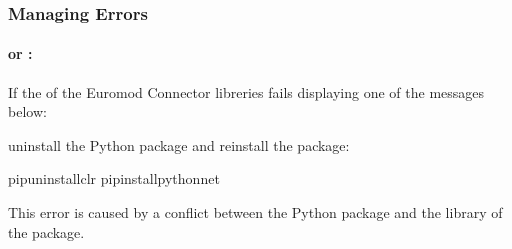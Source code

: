 \documentclass[letterpaper,10pt,english]{sphinxmanual}
\begin{document}
\subsubsection{Managing Errors}
\label{\detokenize{userguide:managing-errors}}

\paragraph{ or :}
\label{\detokenize{userguide:modulenotfounderror-or-attributeerror}}
\sphinxAtStartPar
If the  of the Euromod Connector libreries fails displaying one of the messages below:

\begin{sphinxVerbatim}[commandchars=\\\{\}]
    
\end{sphinxVerbatim}

\begin{sphinxVerbatim}[commandchars=\\\{\}]
      
\end{sphinxVerbatim}

\sphinxAtStartPar
uninstall the Python  package and re\sphinxhyphen{}install the  package:

\begin{sphinxVerbatim}[commandchars=\\\{\}]
\PYGZdl{}pipuninstallclr
\PYGZdl{}pipinstallpythonnet
\end{sphinxVerbatim}

\sphinxAtStartPar
This error is caused by a conflict between the Python  package and the  library of the  package.
\end{document}

